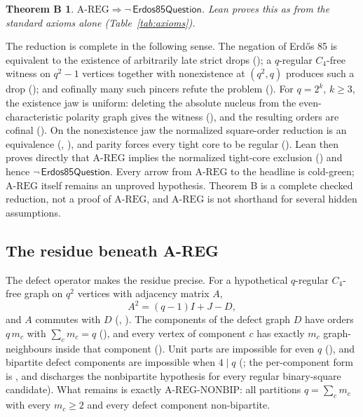\documentclass{anvil-paper}
\newcommand{\AREG}{\mathrm{A\text{-}REG}}
\newcommand{\NONBIP}{\mathrm{A\text{-}REG\text{-}NONBIP}}
\newcommand{\Qn}{\textsf{Erdos85Question}}
\newtheorem*{theoremB}{Theorem B}
\theoremstyle{definition}
\begin{document}
\begin{theoremB}
$\AREG\Rightarrow\neg\,\Qn$. Lean proves this as  from the standard axioms alone (Table~\ref{tab:axioms}).
\end{theoremB}

The reduction is complete in the following sense. The negation of Erdős 85 is equivalent to the existence of arbitrarily late strict drops (); a $q$-regular $C_4$-free witness on $q^2-1$ vertices together with nonexistence at $(q^2,q)$ produces such a drop (); and cofinally many such pincers refute the problem (). For $q=2^k$, $k\ge 3$, the existence jaw is uniform: deleting the absolute nucleus from the even-characteristic polarity graph gives the witness (), and the resulting orders are cofinal (). On the nonexistence jaw the normalized square-order reduction is an equivalence (, ), and parity forces every tight core to be regular (). Lean then proves directly that $\AREG$ implies the normalized tight-core exclusion () and hence $\neg\,\Qn$. Every arrow from $\AREG$ to the headline is cold-green; $\AREG$ itself remains an unproved hypothesis. Theorem B is a complete checked reduction, not a proof of $\AREG$, and $\AREG$ is not shorthand for several hidden assumptions.

\subsection{The residue beneath A-REG}\label{sec:residue}

The defect operator makes the residue precise. For a hypothetical $q$-regular $C_4$-free graph on $q^2$ vertices with adjacency matrix $A$,
\[
A^2=(q-1)I+J-D,
\]
and $A$ commutes with $D$ (, ). The components of the defect graph $D$ have orders $q\,m_c$ with $\sum_c m_c=q$ (), and every vertex of component $c$ has exactly $m_c$ graph-neighbours inside that component (). Unit parts are impossible for even $q$ (), and bipartite defect components are impossible when $4\mid q$ (; the per-component form is , and  discharges the nonbipartite hypothesis for every regular binary-square candidate). What remains is exactly $\NONBIP$: all partitions $q=\sum_c m_c$ with every $m_c\ge 2$ and every defect component non-bipartite.
\end{document}
